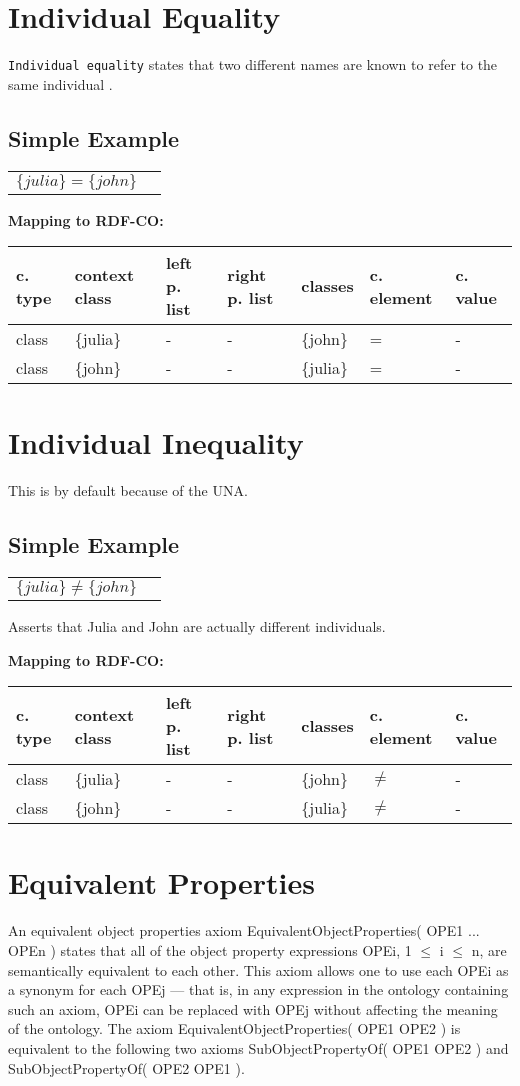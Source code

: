 \documentclass{llncs}
\newcommand{\ms}[1]{\texttt{#1}}
\newenvironment{gcotable}{
  \scriptsize
  \sffamily
  \vspace{0cm}
	\begin{center}
	\textbf{\vspace{0.4cm}Mapping to RDF-CO:} \\
  \begin{tabular}{l|l|l|l|l|l|l}
	\hline
  \textbf{c. type} & \textbf{context class} & \textbf{left p. list} & \textbf{right p. list} & \textbf{classes} & \textbf{c. element} & \textbf{c. value} \\
  \hline

}{
  \hline
  \end{tabular}
	\end{center}
}
\newenvironment{DL}{
  \vspace{0cm}
	\begin{center}
  \begin{tabular}{r l}

}{
  \end{tabular}
	\end{center}
}
\begin{document}
\section{Individual Equality}

\ms{Individual equality} states that two different names are known to refer to the same individual \cite{Kroetzsch2012}.

\subsection{Simple Example}

\begin{DL}
$\{julia\} = \{john\} $\\
\end{DL}

\begin{gcotable}
class & \{julia\} & - & - & \{john\} & = & - \\
class & \{john\} & - & - & \{julia\} & = & - \\
\end{gcotable}

\section{Individual Inequality}

This is by default because of the UNA.

\subsection{Simple Example}

\begin{DL}
$\{julia\} \ne \{john\} $\\
\end{DL}

Asserts that Julia and John are actually different individuals.

\begin{gcotable}
class & \{julia\} & - & - & \{john\} & $\ne$ & - \\
class & \{john\} & - & - & \{julia\} & $\ne$ & - \\
\end{gcotable}

\section{Equivalent Properties}
An equivalent object properties axiom EquivalentObjectProperties( OPE1 ... OPEn ) states that all of the object property expressions OPEi, 1 $\leq$ i $\leq$ n, are semantically equivalent to each other. This axiom allows one to use each OPEi as a synonym for each OPEj — that is, in any expression in the ontology containing such an axiom, OPEi can be replaced with OPEj without affecting the meaning of the ontology. The axiom EquivalentObjectProperties( OPE1 OPE2 ) is equivalent to the following two axioms SubObjectPropertyOf( OPE1 OPE2 ) and SubObjectPropertyOf( OPE2 OPE1 ).
\end{document}
